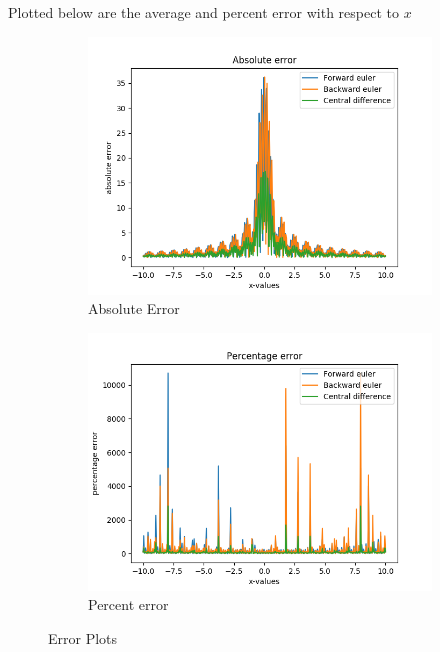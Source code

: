 \documentclass[12pt]{article}
\begin{document}
Plotted below are the average and percent error with respect to $x$ 
\begin{figure}[h]
	\centering
	\begin{subfigure}[h]{0.40\textwidth}
		\centering
		\includegraphics[width=\textwidth]{gprimeabserror400.png}
		\caption{Absolute Error }
	\end{subfigure}
	\begin{subfigure}[h]{0.40\textwidth}
		\centering
		\includegraphics[width=\textwidth]{gprimepercenterror400.png}
		\caption{Percent error}
	\end{subfigure}
	\caption{Error Plots}
\end{figure}
\end{document}

